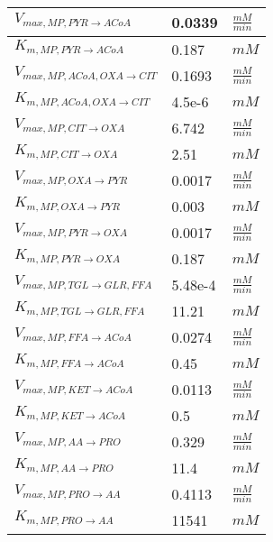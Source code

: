 \begin{supertabular}{lll}
$V_{max, MP,PYR \xrightarrow[]{} ACoA}$ & 0.0339 & $\frac{mM}{min}$       \\ \hline
$K_{m, MP,PYR \xrightarrow[]{} ACoA}$ & 0.187 & $mM$   \\ \hline

$V_{max, MP,ACoA , OXA \xrightarrow[]{} CIT}$ & 0.1693 & $\frac{mM}{min}$       \\ \hline
$K_{m, MP,ACoA , OXA \xrightarrow[]{} CIT}$ & 4.5e-6 & $mM$   \\ \hline

$V_{max, MP,CIT \xrightarrow[]{} OXA}$ & 6.742 & $\frac{mM}{min}$       \\ \hline
$K_{m, MP,CIT \xrightarrow[]{} OXA}$ & 2.51 & $mM$   \\ \hline

$V_{max, MP,OXA \xrightarrow[]{} PYR}$ & 0.0017 & $\frac{mM}{min}$       \\ \hline
$K_{m, MP,OXA \xrightarrow[]{} PYR}$ & 0.003 & $mM$   \\ 
\hline

$V_{max, MP,PYR \xrightarrow[]{} OXA}$ & 0.0017 & $\frac{mM}{min}$       \\ \hline
$K_{m, MP,PYR \xrightarrow[]{} OXA}$ & 0.187 & $mM$   \\ \hline

$V_{max, MP,TGL \xrightarrow[]{} GLR , FFA}$ & 5.48e-4 & $\frac{mM}{min}$       \\ \hline
$K_{m, MP,TGL \xrightarrow[]{} GLR , FFA}$ & 11.21 & $mM$   \\ \hline

$V_{max, MP,FFA \xrightarrow[]{} ACoA}$ & 0.0274 & $\frac{mM}{min}$       \\ \hline
$K_{m, MP,FFA \xrightarrow[]{} ACoA}$ & 0.45 & $mM$   \\ \hline

$V_{max, MP,KET \xrightarrow[]{} ACoA}$ & 0.0113 & $\frac{mM}{min}$       \\ \hline
$K_{m, MP,KET \xrightarrow[]{} ACoA}$ & 0.5 & $mM$   \\ \hline

$V_{max, MP,AA \xrightarrow[]{} PRO}$ & 0.329 & $\frac{mM}{min}$       \\ \hline
$K_{m, MP,AA \xrightarrow[]{} PRO}$ & 11.4 & $mM$   \\ \hline

$V_{max, MP,PRO \xrightarrow[]{} AA}$ & 0.4113 & $\frac{mM}{min}$       \\ \hline
$K_{m, MP,PRO \xrightarrow[]{} AA}$ & 11541 & $mM$   \\ \hline



\end{supertabular}
